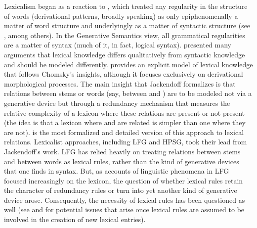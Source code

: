 \documentclass[output=paper
 	        ,biblatex
                ,babelshorthands
                ,newtxmath
                ,draftmode
                ,colorlinks, citecolor=brown
]{langscibook}
\begin{document}
Lexicalism began as a reaction to , which treated any regularity in the
structure of words (derivational patterns, broadly speaking) as only epiphenomenally a matter of
word structure and underlyingly as a matter of syntactic structure (see \citealt{Lakoff1970}, among
others). In the Generative Semantics view, all grammatical regularities are a matter of syntax (much
of it, in fact, logical syntax). \citet{Chomsky1970} presented many arguments that lexical knowledge
differs qualitatively from syntactic knowledge and should be modeled
differently. \citet{Jackendoff1975} provides an explicit model of lexical knowledge that follows Chomsky's
insights, although it focuses exclusively on derivational morphological processes. The main insight
that Jackendoff formalizes is that relations between stems  or words (say, between
 and ) are to be modeled not via a generative device but through a
redundancy mechanism that measures the relative complexity of a lexicon where these relations are
present or not present (the idea is that a lexicon where  and 
are related is simpler than one where they are not). \citet{Bochner1993} is the most formalized and
detailed version of this approach to lexical relations. Lexicalist approaches, including
LFG and HPSG, took their lead from Jackendoff's work.  LFG
has relied heavily on treating relations between stems and between words as lexical rules, rather
than the kind of generative devices that one finds in syntax. But, as accounts of linguistic
phenomena in LFG focused increasingly on the lexicon, the question of whether lexical rules retain
the character of redundancy rules or turn into yet another kind of generative device arose.
Consequently, the necessity of lexical rules has been questioned as well (see
\citealt{KoenigandJurafsky1994} and \citealt[29--49]{Koenig1999c} for potential issues that arise
once lexical rules are assumed to be involved in the creation of new lexical entries).
\end{document}
